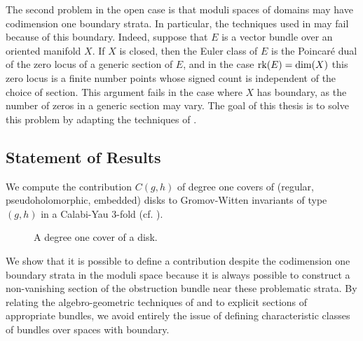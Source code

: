 The second problem in the open case is that moduli spaces of domains may have codimension one boundary strata. In particular, the techniques used in \cite{pand} may fail because of this boundary. Indeed, suppose that $E$ is a vector bundle over an oriented manifold $X$. If $X$ is closed, then the Euler class of $E$ is the Poincar\'{e} dual of the zero locus of a generic section of $E$, and in the case $\operatorname{rk}(E)=\dim(X)$ this zero locus is a finite number points whose signed count is independent of the choice of section. This argument fails in the case where $X$ has boundary, as the number of zeros in a generic section may vary. The goal of this thesis is to solve this problem by adapting the techniques of \cite{pand}.

\subsection{Statement of Results} \label{resultsS}

We compute the contribution $C(g,h)$ of degree one covers of (regular, pseudoholomorphic, embedded) disks to Gromov-Witten invariants of type $(g,h)$ in a Calabi-Yau $3$-fold (cf. \cite{pand}).
\begin{figure}[ht]
\centering
{}
\caption{A degree one cover of a disk.}
\end{figure}
We show that it is possible to define a contribution despite the codimension one boundary strata in the moduli space because it is always possible to construct a non-vanishing section of the obstruction bundle near these problematic strata. By relating the algebro-geometric techniques of \cite{pand} and \cite{niuZinger} to explicit sections of appropriate bundles, we avoid entirely the issue of defining characteristic classes of bundles over spaces with boundary.

